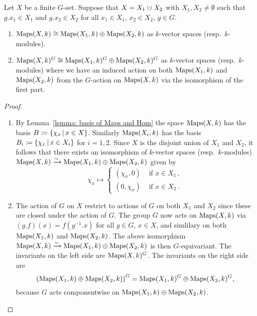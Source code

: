 

\begin{lemma}
  Let $X$ be a finite $G$-set.
  Suppose that $X = X_1 \dotcup X_2$ with $X_1, X_2 \neq \emptyset$ such that $g.x_1 \in X_1$ and $g.x_2 \in X_2$ for all $x_1 \in X_1$, $x_2 \in X_2$, $g \in G$.
  \begin{enumerate}
    \item
      $\operatorname{Maps}(X,k) \cong \operatorname{Maps}(X_1, k) \oplus \operatorname{Maps}(X_2, k)$ as $k$-vector spaces (resp.\ $k$-modules).
    \item
      $\operatorname{Maps}(X,k)^G \cong \operatorname{Maps}(X_1, k)^G \oplus \operatorname{Maps}(X_2, k)^G$ as $k$-vector spaces (resp.\ $k$-modules) where we have an induced action on both $\operatorname{Maps}(X_1, k)$ and $\operatorname{Maps}(X_2, k)$ from the $G$-action on $\operatorname{Maps}(X,k)$ via the isomorphism of the first part.
  \end{enumerate}
\end{lemma}


\begin{proof}
  \leavevmode
  \begin{enumerate}
    \item
      By Lemma~\ref{lemma: basis of Maps and Hom} the space $\operatorname{Maps}(X,k)$ has the basis $B \defined \{\chi_x \suchthat x \in X\}$.
      Similarly $\operatorname{Maps}(X_i, k)$ has the basis $B_i \defined \{\chi_x \suchthat x \in X_i\}$ for $i = 1, 2$.
      Since $X$ is the disjoint union of $X_1$ and $X_2$, it follows that there exists an isomorphism of $k$-vector spaces (resp.\ $k$-modules) $\operatorname{Maps}(X,k) \xrightarrow{\sim} \operatorname{Maps}(X_1, k) \oplus \operatorname{Maps}(X_2, k)$ given by
      \[
                \chi_x
        \mapsto \begin{cases}
                  (\chi_x,0) & \text{ if $x \in X_1$} \,,  \\
                  (0,\chi_x) & \text{ if $x \in X_2$} \,.
                \end{cases}
      \]
    \item
      The action of $G$ on $X$ restrict to actions of $G$ on both $X_1$ and $X_2$ since these are closed under the action of $G$.
      The group $G$ now acts on $\operatorname{Maps}(X, k)$ via $(g.f)(x) = f(g^{-1}.x)$ for all $g \in G$, $x \in X$, and simlilary on both $\operatorname{Maps}(X_1, k)$ and $\operatorname{Maps}(X_2, k)$.
      The above isomorphism $\operatorname{Maps}(X, k) \xrightarrow{\sim} \operatorname{Maps}(X_1, k) \oplus \operatorname{Maps}(X_2, k)$ is then $G$-equivariant.
      The invariants on the left side are $\operatorname{Maps}(X,k)^G$.
      The invariants on the right side are
      \[
          \left( \operatorname{Maps}(X_1, k) \oplus \operatorname{Maps}(X_2, k) \right)^G
        = \operatorname{Maps}(X_1, k)^G \oplus \operatorname{Maps}(X_2, k)^G,
      \]
      because $G$ acts componentwise on $\operatorname{Maps}(X_1, k) \oplus \operatorname{Maps}(X_2, k)$.
    \qedhere
  \end{enumerate}
\end{proof}


